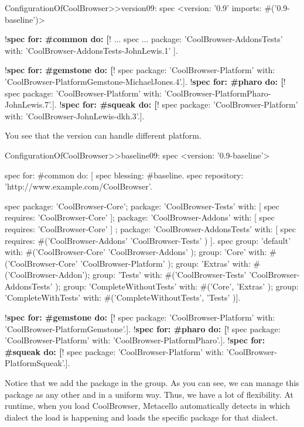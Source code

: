 \documentclass[a4paper,10pt,twoside]{book}
\begin{document}
\begin{code}{} 
ConfigurationOfCoolBrowser>>version09: spec 
	<version: '0.9' imports: #('0.9-baseline')>
	
	!\textbf{spec for: \#common do: [}!
		...
		spec 
	        ...
			package: 'CoolBrowser-AddonsTests' with: 'CoolBrowser-AddonsTests-JohnLewis.1' ].
	
	!\textbf{spec for: \#gemstone do: [}!
		spec package: 'CoolBrowser-Platform' with: 'CoolBrowser-PlatformGemstone-MichaelJones.4'.].
	!\textbf{spec for: \#pharo do: [}!
		spec package: 'CoolBrowser-Platform' with: 'CoolBrowser-PlatformPharo-JohnLewis.7'.].
	!\textbf{spec for: \#squeak do: [}!
		spec package: 'CoolBrowser-Platform' with: 'CoolBrowser-JohnLewis-dkh.3'.].
\end{code}

You see that the version can handle different platform.


\begin{code}{}
ConfigurationOfCoolBrowser>>baseline09: spec 
	<version: '0.9-baseline'>
	
	spec for: #common do: [
		spec blessing: #baseline.
		spec repository: 'http://www.example.com/CoolBrowser'.
		
		spec 
			package: 'CoolBrowser-Core';
			package: 'CoolBrowser-Tests' with: [ spec requires: 'CoolBrowser-Core' ];
			package: 'CoolBrowser-Addons' with: [ spec requires: 'CoolBrowser-Core' ] ;
			package: 'CoolBrowser-AddonsTests' with: [ 
				spec requires: #('CoolBrowser-Addons' 'CoolBrowser-Tests' ) ].
		spec 
			group: 'default' with: #('CoolBrowser-Core' 'CoolBrowser-Addons' );
			group: 'Core' with: #('CoolBrowser-Core' 'CoolBrowser-Platform' );
			group: 'Extras' with: #('CoolBrowser-Addon');
			group: 'Tests' with: #('CoolBrowser-Tests' 'CoolBrowser-AddonsTests' );
			group: 'CompleteWithoutTests' with: #('Core', 'Extras' );
			group: 'CompleteWithTests' with: #('CompleteWithoutTests', 'Tests' )].
			
	!\textbf{spec for: \#gemstone do: [}!
		spec package: 'CoolBrowser-Platform' with: 'CoolBrowser-PlatformGemstone'.].
	!\textbf{spec for: \#pharo do: [}!
		spec package: 'CoolBrowser-Platform' with: 'CoolBrowser-PlatformPharo'.].
	!\textbf{spec for: \#squeak do: [}!
		spec package: 'CoolBrowser-Platform' with: 'CoolBrowser-PlatformSqueak'.].
\end{code}

Notice that we add the package  in the  group. As you can see, we can manage this package as any other and in a uniform way. Thus, we have a lot of flexibility. At runtime, when you load CoolBrowser, Metacello automatically detects in which dialect the load is happening and loads the specific package for that dialect.  	
\end{document}
